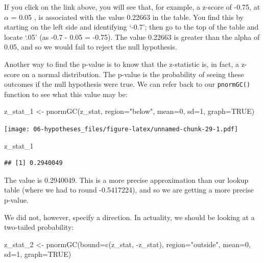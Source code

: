 \documentclass[
]{book}
\newenvironment{Shaded}{\begin{snugshade}}{\end{snugshade}}
\newcommand{\AttributeTok}[1]{\textcolor[rgb]{0.77,0.63,0.00}{#1}}
\newcommand{\ConstantTok}[1]{\textcolor[rgb]{0.00,0.00,0.00}{#1}}
\newcommand{\DecValTok}[1]{\textcolor[rgb]{0.00,0.00,0.81}{#1}}
\newcommand{\FunctionTok}[1]{\textcolor[rgb]{0.00,0.00,0.00}{#1}}
\newcommand{\NormalTok}[1]{#1}
\newcommand{\OtherTok}[1]{\textcolor[rgb]{0.56,0.35,0.01}{#1}}
\newcommand{\SpecialCharTok}[1]{\textcolor[rgb]{0.00,0.00,0.00}{#1}}
\newcommand{\StringTok}[1]{\textcolor[rgb]{0.31,0.60,0.02}{#1}}
\begin{document}
If you click on the link above, you will see that, for example, a z-score of -0.75, at \(\alpha\) = 0.05 , is associated with the value 0.22663 in the table. You find this by starting on the left side and identifying `-0.7'; then go to the top of the table and locate `.05' (as -0.7 - 0.05 = -0.75). The value 0.22663 is greater than the alpha of 0.05, and so we would fail to reject the null hypothesis.

Another way to find the p-value is to know that the z-statistic is, in fact, a z-score on a normal distribution. The p-value is the probability of seeing these outcomes if the null hypothesis were true. We can refer back to our \texttt{pnormGC()} function to see what this value may be:

\begin{Shaded}
\begin{Highlighting}[]
\NormalTok{z\_stat\_1 }\OtherTok{\textless{}{-}} \FunctionTok{pnormGC}\NormalTok{(z\_stat, }\AttributeTok{region=}\StringTok{"below"}\NormalTok{, }\AttributeTok{mean=}\DecValTok{0}\NormalTok{, }\AttributeTok{sd=}\DecValTok{1}\NormalTok{, }\AttributeTok{graph=}\ConstantTok{TRUE}\NormalTok{) }
\end{Highlighting}
\end{Shaded}

\texttt{[image: 06-hypotheses\_files/figure-latex/unnamed-chunk-29-1.pdf]}

\begin{Shaded}
\begin{Highlighting}[]
\NormalTok{z\_stat\_1}
\end{Highlighting}
\end{Shaded}

\begin{verbatim}
## [1] 0.2940049
\end{verbatim}

The value is 0.2940049. This is a more precise approximation than our lookup table (where we had to round -0.5417224), and so we are getting a more precise p-value.

We did not, however, specify a direction. In actuality, we should be looking at a two-tailed probability:

\begin{Shaded}
\begin{Highlighting}[]
\NormalTok{z\_stat\_2 }\OtherTok{\textless{}{-}} \FunctionTok{pnormGC}\NormalTok{(}\AttributeTok{bound=}\FunctionTok{c}\NormalTok{(z\_stat, }\SpecialCharTok{{-}}\NormalTok{z\_stat), }\AttributeTok{region=}\StringTok{"outside"}\NormalTok{, }\AttributeTok{mean=}\DecValTok{0}\NormalTok{, }\AttributeTok{sd=}\DecValTok{1}\NormalTok{, }\AttributeTok{graph=}\ConstantTok{TRUE}\NormalTok{) }
\end{Highlighting}
\end{Shaded}
\end{document}
